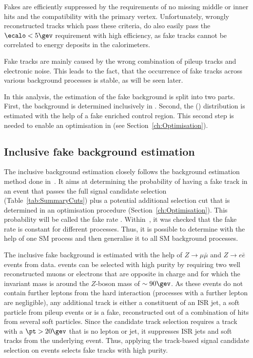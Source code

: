 Fakes are efficiently suppressed by the requirements of no missing middle or inner hits and the compatibility with the primary vertex.
Unfortunately, wrongly reconstructed tracks which pass these criteria, do also easily pass the $\ecalo<5\gev$ requirement with high efficiency, as fake tracks cannot be correlated to energy deposits in the calorimeters. 

Fake tracks are mainly caused by the wrong combination of pileup tracks and electronic noise.
This leads to the fact, that the occurrence of fake tracks across various background processes is stable, as will be seen later.

In this analysis, the estimation of the fake background is split into two parts.
First, the background is determined inclusively in \dedx.
Second, the \dedx (\ias) distribution is estimated with the help of a fake enriched control region. 
This second step is needed to enable an optimisation in \dedx (see Section~\ref{ch:Optimisation}).

\FloatBarrier
\subsection{Inclusive fake background estimation}
The inclusive background estimation closely follows the background estimation method done in~\cite{bib:CMS:DT_Thesis,bib:CMS:DT_8TeV_AN}.
It aims at determining the probability of having a fake track in an event that passes the full signal candidate selection (Table~\ref{tab:SummaryCuts}) plus a potential additional \pt selection cut that is determined in an
optimisation procedure (Section~\ref{ch:Optimisation}).
This probability will be called the fake rate \fakerate.
Within~\cite{bib:CMS:DT_Thesis,bib:CMS:DT_8TeV_AN}, it was checked that the fake rate is constant for different processes. 
Thus, it is possible to determine \fakerate with the help of one SM process and then generalise it to all SM background processes.


The inclusive fake background is estimated with the help of $Z\rightarrow\mu\bar{\mu}$ and $Z\rightarrow e\bar{e}$ events from data.
\Zlep events can be selected with high purity by requiring two well reconstructed muons or electrons that are opposite in charge and for which the invariant mass is around the $Z$-boson mass of $\sim90\gev$.
As these events do not contain further leptons from the hard interaction (processes with a further lepton are negligible), any additional track is either a constituent of an ISR jet, a soft particle from pileup events or is a fake, reconstructed out of a combination of hits from several soft particles.
Since the candidate track selection requires a track with a $\pt>20\gev$ that is no lepton or jet, it suppresses ISR jets and soft tracks from the underlying event.
Thus, applying the track-based signal candidate selection on \Zlep events selects fake tracks with high purity.


